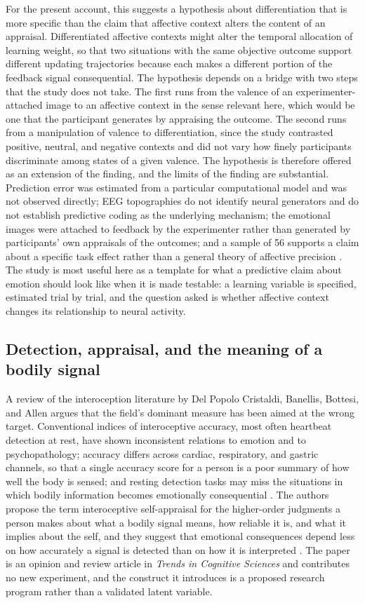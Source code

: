 \documentclass[11pt]{article}
\begin{document}
For the present account, this suggests a hypothesis about differentiation that is more specific than the claim that affective context alters the content of an appraisal. Differentiated affective contexts might alter the temporal allocation of learning weight, so that two situations with the same objective outcome support different updating trajectories because each makes a different portion of the feedback signal consequential. The hypothesis depends on a bridge with two steps that the study does not take. The first runs from the valence of an experimenter-attached image to an affective context in the sense relevant here, which would be one that the participant generates by appraising the outcome. The second runs from a manipulation of valence to differentiation, since the study contrasted positive, neutral, and negative contexts and did not vary how finely participants discriminate among states of a given valence. The hypothesis is therefore offered as an extension of the finding, and the limits of the finding are substantial. Prediction error was estimated from a particular computational model and was not observed directly; EEG topographies do not identify neural generators and do not establish predictive coding as the underlying mechanism; the emotional images were attached to feedback by the experimenter rather than generated by participants' own appraisals of the outcomes; and a sample of 56 supports a claim about a specific task effect rather than a general theory of affective precision \citep{Brown2026}. The study is most useful here as a template for what a predictive claim about emotion should look like when it is made testable: a learning variable is specified, estimated trial by trial, and the question asked is whether affective context changes its relationship to neural activity.

\subsection{Detection, appraisal, and the meaning of a bodily signal}\label{sub:appraisal}

A review of the interoception literature by Del Popolo Cristaldi, Banellis, Bottesi, and Allen argues that the field's dominant measure has been aimed at the wrong target. Conventional indices of interoceptive accuracy, most often heartbeat detection at rest, have shown inconsistent relations to emotion and to psychopathology; accuracy differs across cardiac, respiratory, and gastric channels, so that a single accuracy score for a person is a poor summary of how well the body is sensed; and resting detection tasks may miss the situations in which bodily information becomes emotionally consequential \citep{DelPopolo2026}. The authors propose the term interoceptive self-appraisal for the higher-order judgments a person makes about what a bodily signal means, how reliable it is, and what it implies about the self, and they suggest that emotional consequences depend less on how accurately a signal is detected than on how it is interpreted \citep{DelPopolo2026}. The paper is an opinion and review article in \emph{Trends in Cognitive Sciences} and contributes no new experiment, and the construct it introduces is a proposed research program rather than a validated latent variable.
\end{document}
